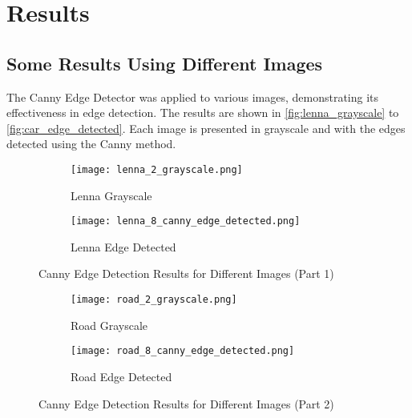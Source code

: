 \section{Results}
\label{sec:results}

\subsection{Some Results Using Different Images}

The Canny Edge Detector was applied to various images, demonstrating its effectiveness in edge detection. The results are shown in \autoref{fig:lenna_grayscale} to \autoref{fig:car_edge_detected}. Each image is presented in grayscale and with the edges detected using the Canny method.

\begin{figure}[ht]
    \centering
    \begin{subfigure}{0.4\textwidth}
        \centering
        \texttt{[image: lenna\_2\_grayscale.png]}
        \caption{Lenna Grayscale}
        \label{fig:lenna_grayscale}
    \end{subfigure}
    \hfill
    \begin{subfigure}{0.4\textwidth}
        \centering
        \texttt{[image: lenna\_8\_canny\_edge\_detected.png]}
        \caption{Lenna Edge Detected}
        \label{fig:lenna_edge_detected}
    \end{subfigure}
    \caption{Canny Edge Detection Results for Different Images (Part 1)}
\end{figure}

\begin{figure}[ht]\ContinuedFloat
    \centering
    \begin{subfigure}{0.4\textwidth}
        \centering
        \texttt{[image: road\_2\_grayscale.png]}
        \caption{Road Grayscale}
        \label{fig:road_grayscale}
    \end{subfigure}
    \begin{subfigure}{0.4\textwidth}
        \centering
        \texttt{[image: road\_8\_canny\_edge\_detected.png]}
        \caption{Road Edge Detected}
        \label{fig:road_edge_detected}
    \end{subfigure}
    \caption{Canny Edge Detection Results for Different Images (Part 2)}
\end{figure}

